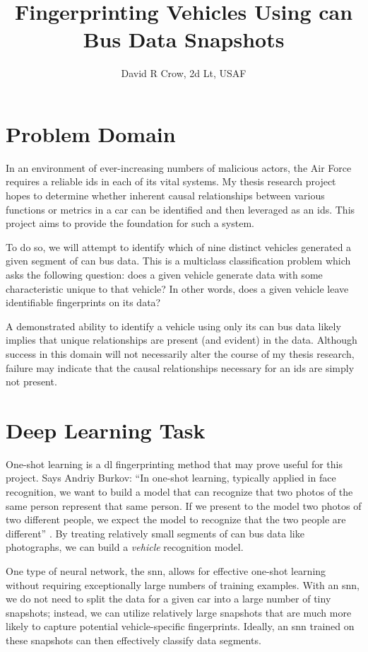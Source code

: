 \documentclass[11pt]{article}
\title{Fingerprinting Vehicles Using \acs{can} Bus Data Snapshots}
\author{David R Crow, 2d Lt, USAF}
\begin{document}
\maketitle

\section{Problem Domain}

In an environment of ever-increasing numbers of malicious actors, the Air Force requires a reliable \ac{ids} in each of its vital systems. My thesis research project hopes to determine whether inherent causal relationships between various functions or metrics in a car can be identified and then leveraged as an \ac{ids}. This project aims to provide the foundation for such a system.

To do so, we will attempt to identify which of nine distinct vehicles generated a given segment of \ac{can} bus data. This is a multiclass classification problem which asks the following question: does a given vehicle generate data with some characteristic unique to that vehicle? In other words, does a given vehicle leave identifiable fingerprints on its data?

A demonstrated ability to identify a vehicle using only its \ac{can} bus data likely implies that unique relationships are present (and evident) in the data. Although success in this domain will not necessarily alter the course of my thesis research, failure may indicate that the causal relationships necessary for an \ac{ids} are simply not present.

\section{Deep Learning Task}

One-shot learning is a \ac{dl} fingerprinting method that may prove useful for this project. Says Andriy Burkov: ``In one-shot learning, typically applied in face recognition, we want to build a model that can recognize that two photos of the same person represent that same person. If we present to the model two photos of two different people, we expect the model to recognize that the two people are different'' \cite{Burkov2019}. By treating relatively small segments of \ac{can} bus data like photographs, we can build a \textit{vehicle} recognition model.

One type of neural network, the \ac{snn}, allows for effective one-shot learning without requiring exceptionally large numbers of training examples. With an \ac{snn}, we do not need to split the data for a given car into a large number of tiny snapshots; instead, we can utilize relatively large snapshots that are much more likely to capture potential vehicle-specific fingerprints. Ideally, an \ac{snn} trained on these snapshots can then effectively classify data segments.
\end{document}
